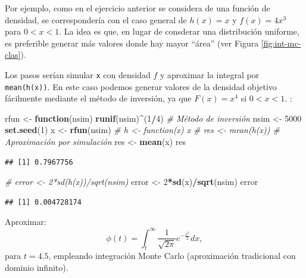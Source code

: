 \documentclass[
]{book}
\newenvironment{Shaded}{\begin{snugshade}}{\end{snugshade}}
\newcommand{\CommentTok}[1]{\textcolor[rgb]{0.56,0.35,0.01}{\textit{#1}}}
\newcommand{\ControlFlowTok}[1]{\textcolor[rgb]{0.13,0.29,0.53}{\textbf{#1}}}
\newcommand{\DecValTok}[1]{\textcolor[rgb]{0.00,0.00,0.81}{#1}}
\newcommand{\KeywordTok}[1]{\textcolor[rgb]{0.13,0.29,0.53}{\textbf{#1}}}
\newcommand{\NormalTok}[1]{#1}
\newcommand{\OperatorTok}[1]{\textcolor[rgb]{0.81,0.36,0.00}{\textbf{#1}}}
\newcommand{\StringTok}[1]{\textcolor[rgb]{0.31,0.60,0.02}{#1}}
\theoremstyle{break}
\theoremstyle{definition}
\theoremstyle{definition}
\theoremstyle{definition}
\theoremstyle{remark}
\let\BeginKnitrBlock\begin \let\EndKnitrBlock\end
\begin{document}
Por ejemplo, como en el ejercicio anterior se considera de una función de densidad,
se correspondería con el caso general de \(h(x) = x\) y \(f(x) = 4x^3\) para \(0<x<1\).
La idea es que, en lugar de consderar una distribución uniforme,
es preferible generar más valores donde hay mayor ``área'' (ver Figura \ref{fig:int-mc-clas}).

Los pasos serían simular \texttt{x} con densidad \(f\) y aproximar la integral por \texttt{mean(h(x))}.
En este caso podemos generar valores de la densidad objetivo fácilmente mediante el método de inversión,
ya que \(F(x) = x^4\) si \(0<x<1\).
:

\begin{Shaded}
\begin{Highlighting}[]
\NormalTok{rfun <-}\StringTok{ }\ControlFlowTok{function}\NormalTok{(nsim) }\KeywordTok{runif}\NormalTok{(nsim)}\OperatorTok{^}\NormalTok{(}\DecValTok{1}\OperatorTok{/}\DecValTok{4}\NormalTok{) }\CommentTok{# Método de inversión}
\NormalTok{nsim <-}\StringTok{ }\DecValTok{5000}
\KeywordTok{set.seed}\NormalTok{(}\DecValTok{1}\NormalTok{)}
\NormalTok{x <-}\StringTok{ }\KeywordTok{rfun}\NormalTok{(nsim)}
\CommentTok{# h <- function(x) x}
\CommentTok{# res <- mean(h(x)) # Aproximación por simulación }
\NormalTok{res <-}\StringTok{ }\KeywordTok{mean}\NormalTok{(x)}
\NormalTok{res}
\end{Highlighting}
\end{Shaded}

\begin{verbatim}
## [1] 0.7967756
\end{verbatim}

\begin{Shaded}
\begin{Highlighting}[]
\CommentTok{# error <- 2*sd(h(x))/sqrt(nsim)}
\NormalTok{error <-}\StringTok{ }\DecValTok{2}\OperatorTok{*}\KeywordTok{sd}\NormalTok{(x)}\OperatorTok{/}\KeywordTok{sqrt}\NormalTok{(nsim)}
\NormalTok{error}
\end{Highlighting}
\end{Shaded}

\begin{verbatim}
## [1] 0.004728174
\end{verbatim}

\BeginKnitrBlock{exercise}
\protect\hypertarget{exr:mc-intinf}{}{\label{exr:mc-intinf} }
\EndKnitrBlock{exercise}

Aproximar:
\[\phi(t)=\int_{t}^{\infty}\frac1{\sqrt{2\pi}}e^{-\frac{x^2}2}dx,\]
para \(t=4.5\), empleando integración Monte Carlo (aproximación tradicional con dominio infinito).
\end{document}
